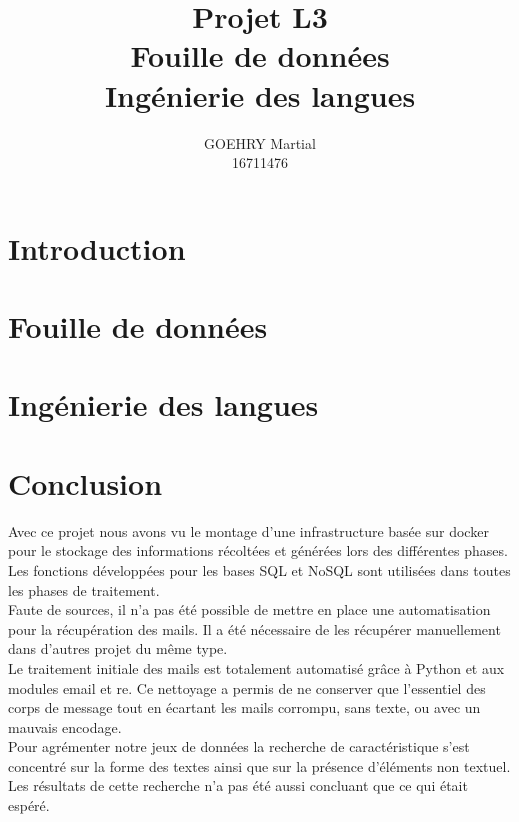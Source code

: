 \documentclass[a4paper,12pt]{article}
\title{Projet L3\\Fouille de données\\Ingénierie des langues}
\author{GOEHRY Martial\\16711476}
\begin{document}
	\maketitle
	\tableofcontents
	\newpage
	
	\section*{Introduction}
		
		\newpage

	\section{Fouille de données}
		\label{sec:fouille-de-donnees}
		
		\newpage
	
	\section{Ingénierie des langues}
		\label{sec:ingenierie-des-langues}
		
		\newpage

%		

	\section*{Conclusion}
		\label{sec:Conclusion}
		Avec ce projet nous avons vu le montage d'une infrastructure basée sur docker pour le stockage des informations récoltées et générées lors des différentes phases.
		Les fonctions développées pour les bases SQL et NoSQL sont utilisées dans toutes les phases de traitement.\\

		Faute de sources, il n'a pas été possible de mettre en place une automatisation pour la récupération des mails.
		Il a été nécessaire de les récupérer manuellement dans d'autres projet du même type.\\

		Le traitement initiale des mails est totalement automatisé grâce à Python et aux modules email et re.
		Ce nettoyage a permis de ne conserver que l'essentiel des corps de message tout en écartant les mails corrompu, sans texte, ou avec un mauvais encodage.\\

		Pour agrémenter notre jeux de données la recherche de caractéristique s'est concentré sur la forme des textes ainsi que sur la présence d'éléments non textuel.
		Les résultats de cette recherche n'a pas été aussi concluant que ce qui était espéré.\\
\end{document}

